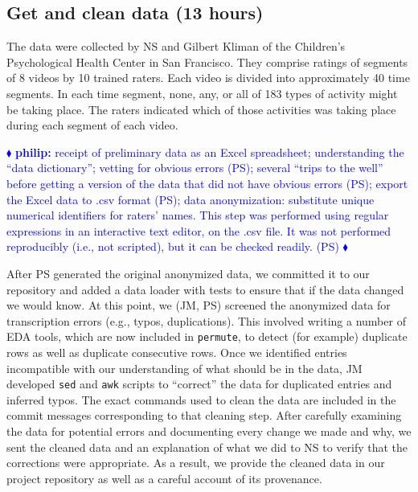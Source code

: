 \documentclass[]{article}
\newcommand{\philip}[1] { \textcolor{blue} {
\ensuremath{\blacklozenge} {\bf philip:}  {#1}
\ensuremath{\blacklozenge} } }
\begin{document}
\subsection{Get and clean data (13 hours)}

The data were collected by NS and Gilbert Kliman of the Children's
Psychological Health Center in San Francisco.
They comprise ratings of segments of 8 videos by 10 trained raters.
Each video is divided into approximately 40 time segments.
In each time segment, none, any, or all of 183 types of activity might be
taking place.
The raters indicated which of those activities was taking place during each
segment of each video.

\philip{
receipt of preliminary data as an Excel spreadsheet; understanding the ``data
dictionary''; vetting for obvious errors (PS);
several ``trips to the well'' before getting a version of the data that did not
have obvious errors (PS);
export the Excel data to .csv format (PS);
data anonymization: substitute unique numerical identifiers for raters' names. 
This step was performed using regular expressions in an interactive text
editor, on the .csv file.
It was not performed reproducibly (i.e., not scripted), but it can be checked
readily. (PS) 
}

After PS generated the original anonymized data, we committed it to our
repository and added a data loader with tests to ensure that if the data
changed we would know.
At this point, we (JM, PS) screened the anonymized data for transcription
errors (e.g., typos, duplications).  This involved writing a number of EDA
tools, which are now included in \texttt{permute}, to detect (for example)
duplicate rows as well as duplicate consecutive rows.
Once we identified entries incompatible with our understanding of what
should be in the data, JM developed \texttt{sed} and \texttt{awk} scripts
to ``correct'' the data for duplicated entries and inferred typos.
The exact commands used to clean the data are included in the commit
messages corresponding to that cleaning step.
After carefully examining the data for potential errors and documenting
every change we made and why, we sent the cleaned data and an explanation
of what we did to NS to verify that the corrections were appropriate.
As a result, we provide the cleaned data in our project repository as well
as a careful account of its provenance.
\end{document}
